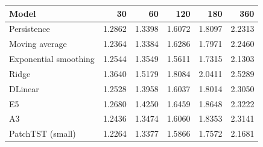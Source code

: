 \begin{tabular}{lrrrrr}
\toprule
Model & 30 & 60 & 120 & 180 & 360 \\
\midrule
Persistence & 1.2862 & 1.3398 & 1.6072 & 1.8097 & 2.2313 \\
Moving average & 1.2364 & 1.3384 & 1.6286 & 1.7971 & 2.2460 \\
Exponential smoothing & 1.2544 & 1.3549 & 1.5611 & 1.7315 & 2.1303 \\
Ridge & 1.3640 & 1.5179 & 1.8084 & 2.0411 & 2.5289 \\
DLinear & 1.2528 & 1.3958 & 1.6037 & 1.8014 & 2.3050 \\
E5 & 1.2680 & 1.4250 & 1.6459 & 1.8648 & 2.3222 \\
A3 & 1.2436 & 1.3474 & 1.6060 & 1.8353 & 2.3141 \\
PatchTST (small) & 1.2264 & 1.3377 & 1.5866 & 1.7572 & 2.1681 \\
\bottomrule
\end{tabular}

